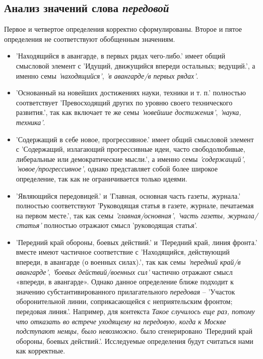 \subsection*{Анализ значений слова \textit{передовой}}

Первое и четвертое определения корректно сформулированы.
Второе и пятое определения не соответствуют обобщенным значениям.

\begin{itemize}
    \item ’Находящийся в авангарде, в первых рядах чего-либо.’ имеет общий смысловой элемент с
’Идущий, движущийся впереди остальных; ведущий.’,
а именно семы \textit{’находящийся’}, \textit{’в авангарде/в первых рядах’}.

    \item ’Основанный на новейших достижениях науки, техники и т. п.’ полностью соответствует
’Превосходящий других по уровню своего технического развития.’,
так как включает те же семы \textit{’новейшие достижения’}, \textit{’наука, техника’}.

    \item ’Содержащий в себе новое, прогрессивное.’ имеет общий смысловой элемент с
’Содержащий, излагающий прогрессивные идеи, часто свободолюбивые, либеральные или демократические мысли.’,
а именно семы \textit{’содержащий’}, \textit{’новое/прогрессивное’}, однако представляет собой более широкое
определение, так как не ограничивается только идеями.

    \item ’Являющийся передовицей.’ и ’Главная, основная часть газеты, журнала.’ полностью соответствуют
’Руководящая статья в газете, журнале, печатаемая на первом месте.’, так как семы \textit{’главная/основная’}, \textit{’часть газеты, журнала/статья’} полностью отражают смысл ’руководящая статья’.
\end{itemize}

\begin{itemize}
    \item ’Передний край обороны, боевых действий.’ и ’Передний край, линия фронта.’
вместе имеют частичное соответствие с ’Находящийся, действующий впереди, в авангарде (о военных силах).’,
так как семы \textit{’передний край/в авангарде’}, \textit{’боевых действий/военных сил’} частично отражают смысл «впереди, в авангарде».
Однако данное определение ближе подходит к значению субстантивированного прилагательного \textit{передовая} –
’Участок оборонительной линии, соприкасающейся с неприятельским фронтом; передовая линия.’.
Например, для контекста \textit{Такое случилось еще раз, потому что отказать во встрече уходящему на передовую,
когда к Москве подступают немцы, было невозможно.} было сгенерировано ’Передний край обороны, боевых действий.’.
Исследуемые определения будут считаться нами как корректные.
\end{itemize}

